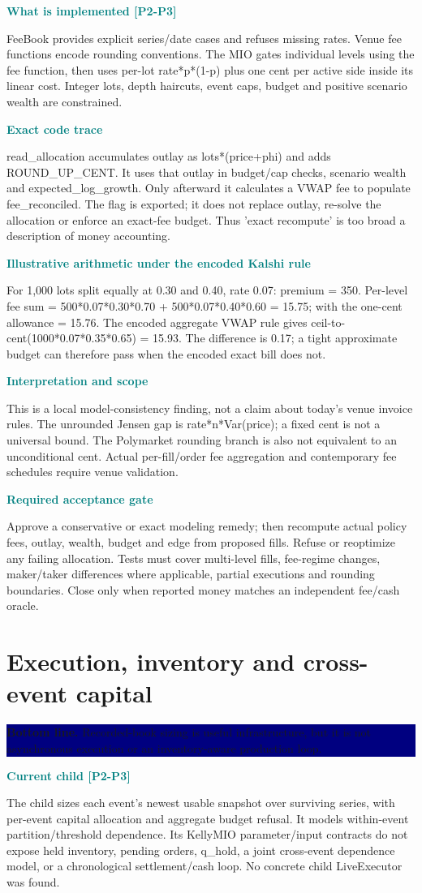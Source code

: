 \documentclass[10pt,letterpaper]{article}
\newcommand{\bl}[1]{\noindent\colorbox{navy}{\parbox{\dimexpr\linewidth-2\fboxsep}{\color{white}\textbf{Bottom line.} #1}}\par\medskip}
\newcommand{\topic}[2]{\clearpage\section{#1}\bl{#2}}
\newcommand{\sub}[1]{\par\textbf{\textcolor{teal}{#1}}\par}
\begin{document}
\sub{What is implemented [P2-P3]}
FeeBook provides explicit series/date cases and refuses missing rates. Venue fee functions encode rounding conventions. The MIO gates individual levels using the fee function, then uses per-lot rate*p*(1-p) plus one cent per active side inside its linear cost. Integer lots, depth haircuts, event caps, budget and positive scenario wealth are constrained.
\sub{Exact code trace}
read\_allocation accumulates outlay as lots*(price+phi) and adds ROUND\_UP\_CENT. It uses that outlay in budget/cap checks, scenario wealth and expected\_log\_growth. Only afterward it calculates a VWAP fee to populate fee\_reconciled. The flag is exported; it does not replace outlay, re-solve the allocation or enforce an exact-fee budget. Thus 'exact recompute' is too broad a description of money accounting.
\sub{Illustrative arithmetic under the encoded Kalshi rule}
For 1,000 lots split equally at 0.30 and 0.40, rate 0.07: premium = 350. Per-level fee sum = 500*0.07*0.30*0.70 + 500*0.07*0.40*0.60 = 15.75; with the one-cent allowance = 15.76. The encoded aggregate VWAP rule gives ceil-to-cent(1000*0.07*0.35*0.65) = 15.93. The difference is 0.17; a tight approximate budget can therefore pass when the encoded exact bill does not.
\sub{Interpretation and scope}
This is a local model-consistency finding, not a claim about today's venue invoice rules. The unrounded Jensen gap is rate*n*Var(price); a fixed cent is not a universal bound. The Polymarket rounding branch is also not equivalent to an unconditional cent. Actual per-fill/order fee aggregation and contemporary fee schedules require venue validation.
\sub{Required acceptance gate}
Approve a conservative or exact modeling remedy; then recompute actual policy fees, outlay, wealth, budget and edge from proposed fills. Refuse or reoptimize any failing allocation. Tests must cover multi-level fills, fee-regime changes, maker/taker differences where applicable, partial executions and rounding boundaries. Close only when reported money matches an independent fee/cash oracle.
\topic{Execution, inventory and cross-event capital}{Recorded-book sizing is useful infrastructure, but it is not asynchronous execution or an inventory-aware production loop.}
\sub{Current child [P2-P3]}
The child sizes each event's newest usable snapshot over surviving series, with per-event capital allocation and aggregate budget refusal. It models within-event partition/threshold dependence. Its KellyMIO parameter/input contracts do not expose held inventory, pending orders, q\_hold, a joint cross-event dependence model, or a chronological settlement/cash loop. No concrete child LiveExecutor was found.
\end{document}

